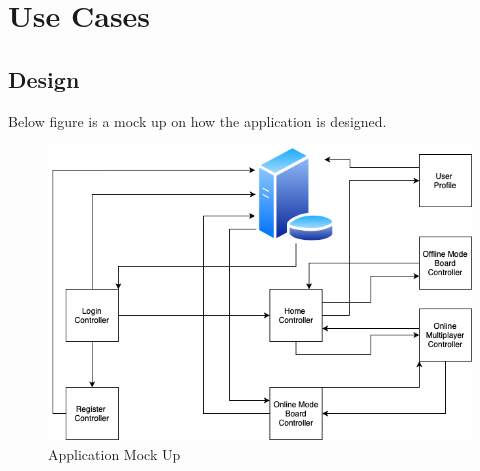 \documentclass{article}
\begin{document}
\section{Use Cases}
    \subsection{Design}
        Below figure is a mock up on how the application is designed.\\ 
        \begin{figure}[h]
        \centering
        \includegraphics[width=5in]{images/tictacreflexdiagram.png}
        \caption{Application Mock Up}
        \end{figure}
        ~\newline
        ~\newpage
    
\end{document}
